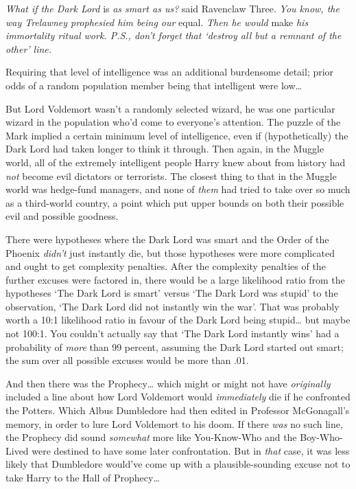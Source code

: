 \emph{What if the Dark Lord} is \emph{as smart as us?} said Ravenclaw
Three. \emph{You know, the way Trelawney prophesied him being our}
equal. \emph{Then he would} make \emph{his immortality ritual work.
P.S., don't forget that `destroy all but a remnant of the other' line.}

Requiring that level of intelligence was an additional burdensome
detail; prior odds of a random population member being that intelligent
were low\ldots{}

But Lord Voldemort wasn't a randomly selected wizard, he was one
particular wizard in the population who'd come to everyone's attention.
The puzzle of the Mark implied a certain minimum level of intelligence,
even if (hypothetically) the Dark Lord had taken longer to think it
through. Then again, in the Muggle world, all of the extremely
intelligent people Harry knew about from history had \emph{not} become
evil dictators or terrorists. The closest thing to that in the Muggle
world was hedge-fund managers, and none of \emph{them} had tried to take
over so much as a third-world country, a point which put upper bounds on
both their possible evil and possible goodness.

There were hypotheses where the Dark Lord was smart and the Order of the
Phoenix \emph{didn't} just instantly die, but those hypotheses were more
complicated and ought to get complexity penalties. After the complexity
penalties of the further excuses were factored in, there would be a
large likelihood ratio from the hypotheses `The Dark Lord is smart'
versus `The Dark Lord was stupid' to the observation, `The Dark Lord did
not instantly win the war'. That was probably worth a 10:1 likelihood
ratio in favour of the Dark Lord being stupid\ldots{} but maybe not
100:1. You couldn't actually say that `The Dark Lord instantly wins' had
a probability of \emph{more} than 99 percent, assuming the Dark Lord
started out smart; the sum over all possible excuses would be more than
.01.

And then there was the Prophecy\ldots{} which might or might not have
\emph{originally} included a line about how Lord Voldemort would
\emph{immediately} die if he confronted the Potters. Which Albus
Dumbledore had then edited in Professor McGonagall's memory, in order to
lure Lord Voldemort to his doom. If there \emph{was} no such line, the
Prophecy did sound \emph{somewhat} more like You-Know-Who and the
Boy-Who-Lived were destined to have some later confrontation. But in
\emph{that} case, it was less likely that Dumbledore would've come up
with a plausible-sounding excuse not to take Harry to the Hall of
Prophecy\ldots{}

